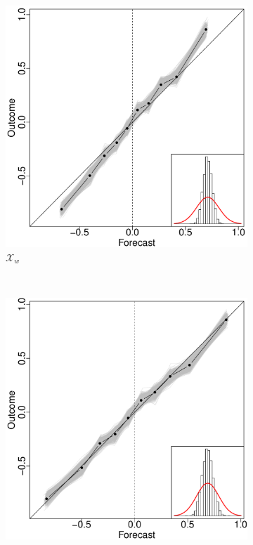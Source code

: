 \documentclass[11pt]{article}
\theoremstyle{definition}
\theoremstyle{definition}
\begin{document}
\begin{figure}[t!]
\begin{subfigure}[b]{0.241\textwidth}
                \includegraphics[width=\textwidth]{SimDepOLP.pdf}
                \caption{$\mathcal{X}_w$}
        \label{RelOWAHigh}
        \end{subfigure}
        ~ %
        \begin{subfigure}[b]{0.241\textwidth}
                \includegraphics[width=\textwidth]{SimDepELOP.pdf}

\end{subfigure}
\end{figure}
\end{document}
